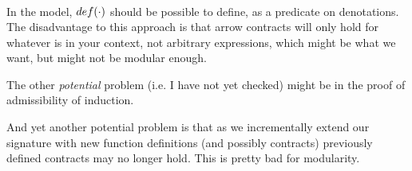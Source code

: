 \documentclass[preprint,nocopyrightspace,draft]{sigplanconf}
\begin{document}
\[\begin{array}{lll}
\end{array}\]


In the model, ${\mathop{def}}(\cdot)$ should be possible to define, as a
predicate on denotations. The disadvantage to this approach is that
arrow contracts will only hold for whatever is in your context, not
arbitrary expressions, which might be what we want, but might not be
modular enough.

The other {\em potential} problem (i.e. I have not yet checked) might be in the 
proof of admissibility of induction. 

And yet another potential problem is that as we incrementally extend our signature 
with new function definitions (and possibly contracts) previously defined contracts
may no longer hold. This is pretty bad for modularity.
\end{document}
